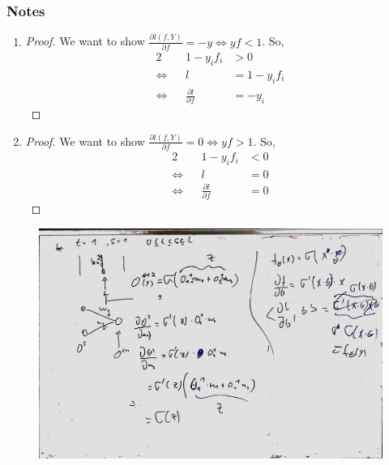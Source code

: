\documentclass[a4paper]{article}
\begin{document}
\subsubsection{Notes}
\begin{enumerate}
	\item 
	\begin{proof}
		We want to show $\frac{\partial l(f,Y)}{\partial f} = -y \Leftrightarrow yf < 1$. So,
		\begin{alignat*}{2}
			                && 1-y_if_i &> 0 \\
			\Leftrightarrow && l &=1-y_if_i \\
			\Leftrightarrow && \frac{\partial l}{\partial f} &=-y_i
		\end{alignat*}
	  \end{proof}
	\item 
	\begin{proof}
		We want to show $\frac{\partial l(f,Y)}{\partial f} = 0 \Leftrightarrow yf > 1$. So,
		\begin{alignat*}{2}
							&& 1-y_if_i &< 0 \\
			\Leftrightarrow && l &=0 \\
			\Leftrightarrow && \frac{\partial l}{\partial f} &=0
		\end{alignat*}
	  \end{proof}
\end{enumerate}


\begin{figure}
	\centering
	\includegraphics[width=\textwidth]{whiteboard_notes/20180706_01.jpg}
\end{figure}
\end{document}
